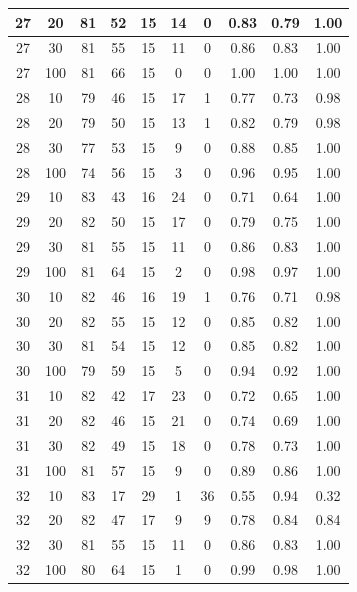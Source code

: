 \begin{longtable}{ |c|c|c|c|c|c|c|c|c|c| }
            27 & 20 & 81 & 52 & 15 & 14 & 0 & 0.83 & 0.79 & 1.00 \\ \hline
            27 & 30 & 81 & 55 & 15 & 11 & 0 & 0.86 & 0.83 & 1.00 \\ \hline
            27 & 100 & 81 & 66 & 15 & 0 & 0 & 1.00 & 1.00 & 1.00 \\ \hline
            28 & 10 & 79 & 46 & 15 & 17 & 1 & 0.77 & 0.73 & 0.98 \\ \hline
            28 & 20 & 79 & 50 & 15 & 13 & 1 & 0.82 & 0.79 & 0.98 \\ \hline
            28 & 30 & 77 & 53 & 15 & 9 & 0 & 0.88 & 0.85 & 1.00 \\ \hline
            28 & 100 & 74 & 56 & 15 & 3 & 0 & 0.96 & 0.95 & 1.00 \\ \hline
            29 & 10 & 83 & 43 & 16 & 24 & 0 & 0.71 & 0.64 & 1.00 \\ \hline
            29 & 20 & 82 & 50 & 15 & 17 & 0 & 0.79 & 0.75 & 1.00 \\ \hline
            29 & 30 & 81 & 55 & 15 & 11 & 0 & 0.86 & 0.83 & 1.00 \\ \hline
            29 & 100 & 81 & 64 & 15 & 2 & 0 & 0.98 & 0.97 & 1.00 \\ \hline
            30 & 10 & 82 & 46 & 16 & 19 & 1 & 0.76 & 0.71 & 0.98 \\ \hline
            30 & 20 & 82 & 55 & 15 & 12 & 0 & 0.85 & 0.82 & 1.00 \\ \hline
            30 & 30 & 81 & 54 & 15 & 12 & 0 & 0.85 & 0.82 & 1.00 \\ \hline
            30 & 100 & 79 & 59 & 15 & 5 & 0 & 0.94 & 0.92 & 1.00 \\ \hline
            31 & 10 & 82 & 42 & 17 & 23 & 0 & 0.72 & 0.65 & 1.00 \\ \hline
            31 & 20 & 82 & 46 & 15 & 21 & 0 & 0.74 & 0.69 & 1.00 \\ \hline
            31 & 30 & 82 & 49 & 15 & 18 & 0 & 0.78 & 0.73 & 1.00 \\ \hline
            31 & 100 & 81 & 57 & 15 & 9 & 0 & 0.89 & 0.86 & 1.00 \\ \hline
            32 & 10 & 83 & 17 & 29 & 1 & 36 & 0.55 & 0.94 & 0.32 \\ \hline
            32 & 20 & 82 & 47 & 17 & 9 & 9 & 0.78 & 0.84 & 0.84 \\ \hline
            32 & 30 & 81 & 55 & 15 & 11 & 0 & 0.86 & 0.83 & 1.00 \\ \hline
            32 & 100 & 80 & 64 & 15 & 1 & 0 & 0.99 & 0.98 & 1.00 \\ \hline

\end{longtable}
